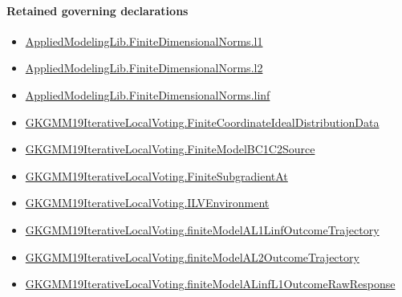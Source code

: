 \documentclass[10pt]{article}
\begin{document}
\paragraph{Retained governing declarations}
\begin{itemize}\raggedright
\item \hyperlink{governing-declaration-3d99a970244a38c7}{Applied\allowbreak{}Modeling\allowbreak{}Lib.\allowbreak{}Finite\allowbreak{}Dimensional\allowbreak{}Norms.\allowbreak{}l1}
\item \hyperlink{governing-declaration-08313452edb53fe9}{Applied\allowbreak{}Modeling\allowbreak{}Lib.\allowbreak{}Finite\allowbreak{}Dimensional\allowbreak{}Norms.\allowbreak{}l2}
\item \hyperlink{governing-declaration-1a7ba4652046f8ed}{Applied\allowbreak{}Modeling\allowbreak{}Lib.\allowbreak{}Finite\allowbreak{}Dimensional\allowbreak{}Norms.\allowbreak{}linf}
\item \hyperlink{governing-declaration-57171116eb928bf6}{GKGMM19\allowbreak{}Iterative\allowbreak{}Local\allowbreak{}Voting.\allowbreak{}Finite\allowbreak{}Coordinate\allowbreak{}Ideal\allowbreak{}Distribution\allowbreak{}Data}
\item \hyperlink{governing-declaration-b2172f203bb89b25}{GKGMM19\allowbreak{}Iterative\allowbreak{}Local\allowbreak{}Voting.\allowbreak{}Finite\allowbreak{}Model\allowbreak{}BC1\allowbreak{}C2\allowbreak{}Source}
\item \hyperlink{governing-declaration-e4f39da4bff46cef}{GKGMM19\allowbreak{}Iterative\allowbreak{}Local\allowbreak{}Voting.\allowbreak{}Finite\allowbreak{}Subgradient\allowbreak{}At}
\item \hyperlink{governing-declaration-df2ca62df1846667}{GKGMM19\allowbreak{}Iterative\allowbreak{}Local\allowbreak{}Voting.\allowbreak{}ILV\allowbreak{}Environment}
\item \hyperlink{governing-declaration-fdfeb9d871d65d8b}{GKGMM19\allowbreak{}Iterative\allowbreak{}Local\allowbreak{}Voting.\allowbreak{}finite\allowbreak{}Model\allowbreak{}AL1\allowbreak{}Linf\allowbreak{}Outcome\allowbreak{}Trajectory}
\item \hyperlink{governing-declaration-103ade36d7667502}{GKGMM19\allowbreak{}Iterative\allowbreak{}Local\allowbreak{}Voting.\allowbreak{}finite\allowbreak{}Model\allowbreak{}AL2\allowbreak{}Outcome\allowbreak{}Trajectory}
\item \hyperlink{governing-declaration-bc7b235e5fd132ef}{GKGMM19\allowbreak{}Iterative\allowbreak{}Local\allowbreak{}Voting.\allowbreak{}finite\allowbreak{}Model\allowbreak{}A\allowbreak{}Linf\allowbreak{}L1\allowbreak{}Outcome\allowbreak{}Raw\allowbreak{}Response}

\end{itemize}
\end{document}
